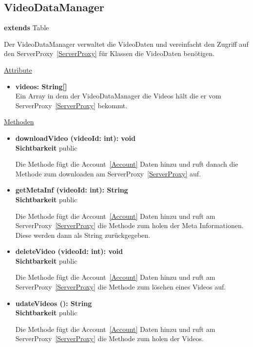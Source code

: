 \newpage
\subsection{VideoDataManager}\label{VideoDataManager}
\textbf{extends}  Table \newline

Der VideoDataManager verwaltet die VideoDaten und vereinfacht den Zugriff auf den ServerProxy~\eqref{ServerProxy} für Klassen die VideoDaten benötigen.

\underline{Attribute}
\begin{itemize}
\itemsep0pt

\item \textbf{videos: String[]}\hfill\\
Ein Array in dem der VideoDataManager die Videos hält die er vom ServerProxy~\eqref{ServerProxy} bekommt.
\end{itemize}

\underline{Methoden}
\begin{itemize}
\itemsep0pt


\item \textbf{downloadVideo (videoId: int): void}\hfill\\
\textbf{Sichtbarkeit} public

Die Methode fügt die Account~\eqref{Account} Daten hinzu und ruft danach die Methode zum downloaden am ServerProxy~\eqref{ServerProxy} auf.

\item \textbf{getMetaInf (videoId: int): String}\hfill\\
\textbf{Sichtbarkeit} public

Die Methode fügt die Account~\eqref{Account} Daten hinzu und ruft am ServerProxy~\eqref{ServerProxy} die Methode zum holen der Meta Informationen. Diese werden dann als String zurückgegeben.

\item \textbf{deleteVideo (videoId: int): void}\hfill\\
\textbf{Sichtbarkeit} public

Die Methode fügt die Account~\eqref{Account} Daten hinzu und ruft am ServerProxy~\eqref{ServerProxy} die Methode zum löschen eines Videos auf.

\item \textbf{udateVideos (): String}\hfill\\
\textbf{Sichtbarkeit} public

Die Methode fügt die Account~\eqref{Account} Daten hinzu und ruft am ServerProxy~\eqref{ServerProxy} die Methode zum holen der Videos.

\end{itemize}
